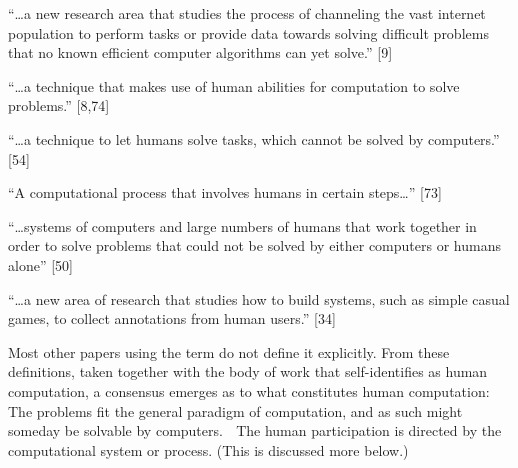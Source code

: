 \documentclass{acm_proc_article-sp} %
\begin{document}
 “…a new research area that studies the process of channeling the vast internet population to perform tasks or provide data towards solving difficult problems that no known efficient computer algorithms can yet solve.” [9] 

“…a technique that makes use of human abilities for computation to solve problems.” [8,74]  

“…a technique to let humans solve tasks, which cannot be solved by computers.” [54] 

“A computational process that involves humans in certain steps…” [73] 

“…systems of computers and large numbers of humans that work together in order to solve problems that could not be solved by either computers or humans alone” [50] 

“…a new area of research that studies how to build systems, such as simple casual games, to collect annotations from human users.” [34]

Most other papers using the term do not define it explicitly.  From these definitions, taken together with the body of work that self-identifies as human computation, a consensus emerges as to what constitutes human computation:  The problems fit the general paradigm of computation, and as such might someday be solvable by computers.   The human participation is directed by the computational system or process.  (This is discussed more below.) 
\end{document}
